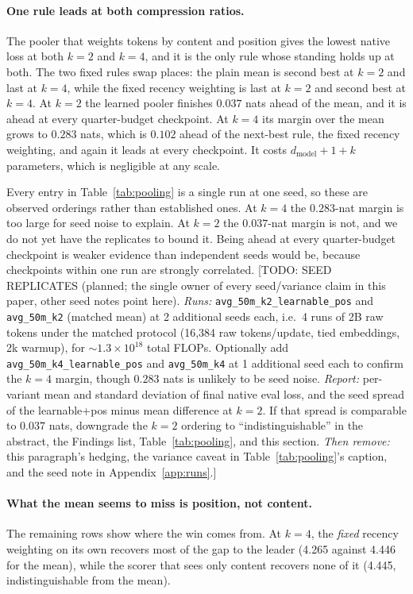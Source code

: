 \documentclass[11pt]{article}
\newcommand{\todo}[1]{\textcolor{warnred}{[TODO: #1]}}
\newcommand{\dmodel}{d_{\mathrm{model}}}
\begin{document}
\paragraph{One rule leads at both compression ratios.}
The pooler that weights tokens by content and position gives the lowest native
loss at both $k{=}2$ and $k{=}4$, and it is the only rule whose standing holds
up at both. The two fixed rules swap places: the plain mean is second best at
$k{=}2$ and last at $k{=}4$, while the fixed recency weighting is last at
$k{=}2$ and second best at $k{=}4$. At $k{=}2$ the learned pooler
finishes $0.037$ nats ahead of the mean, and it is ahead at every
quarter-budget checkpoint. At $k{=}4$ its margin over the mean grows to $0.283$
nats, which is $0.102$ ahead of the next-best rule, the fixed recency
weighting, and again it leads at every checkpoint. It costs $\dmodel + 1 + k$
parameters, which is negligible at any scale.

Every entry in Table~\ref{tab:pooling} is a single run at one seed, so these
are observed orderings rather than established ones. At $k{=}4$ the $0.283$-nat
margin is too large for seed noise to explain. At $k{=}2$ the $0.037$-nat margin
is not, and we do not yet have the replicates to bound it. Being ahead at every
quarter-budget checkpoint is weaker evidence than independent seeds would be,
because checkpoints within one run are strongly correlated.
\todo{SEED REPLICATES (planned; the single owner of every seed/variance
claim in this paper, other seed notes point here).
\emph{Runs:} \texttt{avg\_50m\_k2\_learnable\_pos} and
\texttt{avg\_50m\_k2} (matched mean) at 2 additional seeds each, i.e.\ 4
runs of 2B raw tokens under the matched protocol
(16{,}384 raw tokens/update, tied embeddings, 2k warmup), for
${\sim}1.3\times10^{18}$ total FLOPs. Optionally add
\texttt{avg\_50m\_k4\_learnable\_pos} and \texttt{avg\_50m\_k4} at 1
additional seed each to confirm the $k{=}4$ margin, though $0.283$ nats is
unlikely to be seed noise.
\emph{Report:} per-variant mean and standard deviation of final native
eval loss, and the seed spread of the learnable+pos minus mean difference
at $k{=}2$. If that spread is comparable to $0.037$ nats, downgrade the
$k{=}2$ ordering to ``indistinguishable'' in the abstract, the Findings
list, Table~\ref{tab:pooling}, and this section.
\emph{Then remove:} this paragraph's hedging, the variance caveat in
Table~\ref{tab:pooling}'s caption, and the seed note in
Appendix~\ref{app:runs}.}

\paragraph{What the mean seems to miss is position, not content.}
The remaining rows show where the win comes from. At $k{=}4$, the
\emph{fixed} recency weighting on its own recovers most of the gap to the
leader (4.265 against 4.446 for the mean), while the scorer that sees only
content recovers none of it (4.445, indistinguishable from the mean).
\end{document}
